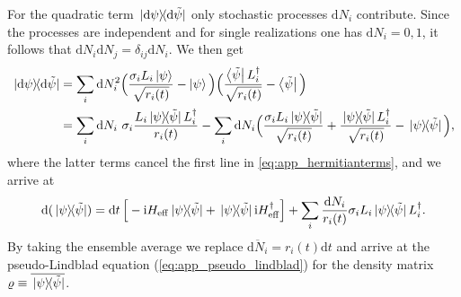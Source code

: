 \documentclass[twocolumn,prl,superscriptaddress]{revtex4-2}
\renewcommand{\i}{\mathrm i}
\begin{document}
For the quadratic term $\dyad*{\mathrm d \psi}{\mathrm d \tilde \psi}$ only stochastic processes $\mathrm d N_i$ contribute. Since the processes are independent and for single realizations one has $\mathrm dN_i=0,1$, it follows that $\mathrm dN_i \mathrm dN_j = \delta_{ij}\mathrm dN_i$. We then get
\begin{align}
	\begin{split}
		\dyad*{\mathrm d \psi}{\mathrm d \tilde \psi} & = \sum_i \mathrm dN_i^2 \Big(\frac{\sigma_iL_i \ket{\psi} }{\sqrt{ r_i(t)}} - \ket{\psi} \Big)\Big(\frac{ \bra{\tilde \psi}L_i^\dagger }{\sqrt{ r_i(t)}} - \bra{\tilde \psi} \Big)  \\&= \sum_i \mathrm dN_i\ \sigma_i \frac{L_i \dyad*{ \psi}{\tilde\psi} L_i^\dagger}{ r_i(t)} - \sum_i \mathrm dN_i \Big(\frac{\sigma_i L_i \dyad*{ \psi}{\tilde\psi}}{\sqrt{ r_i(t)}} + \frac{\dyad*{ \psi}{\tilde\psi} L_i^\dagger  }{\sqrt{ r_i(t)}} - \dyad*{ \psi}{\tilde\psi} \Big) ,
	\end{split}
\end{align}
where the latter terms cancel the first line in \cref{eq:app_hermitianterms}, and we arrive at
\begin{align}
	\mathrm d (\dyad*{ \psi}{ \tilde\psi}) =\mathrm dt\, \Big[- \i H_\mathrm{eff} \dyad*{ \psi}{ \tilde\psi} + \dyad*{ \psi}{ \tilde\psi} \i H_\mathrm{eff}^\dagger\Big] +  \sum_i  \frac{\mathrm dN_i }{ r_i(t) } \sigma_i L_i\dyad*{ \psi}{ \tilde\psi} L_i^\dagger .
\end{align}
By taking the ensemble average we replace $\overline { \mathrm d N_i }= r_i(t) \mathrm d t$ and arrive at the pseudo-Lindblad equation (\ref{eq:app_pseudo_lindblad}) for the density matrix $\varrho \equiv \overline{\dyad*{ \psi}{ \tilde\psi}}$.
\end{document}
